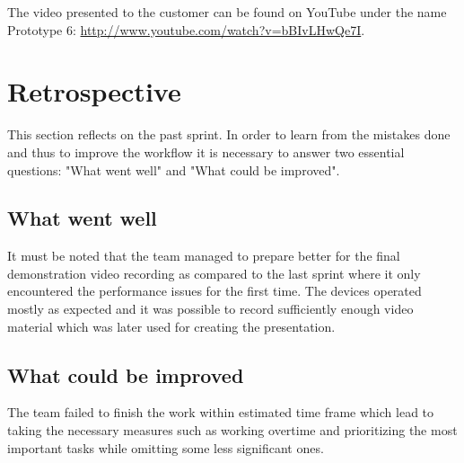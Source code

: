 The video presented to the customer can be found on YouTube under the name Prototype 6: \url{http://www.youtube.com/watch?v=bBIvLHwQe7I}.

\section{Retrospective}
This section reflects on the past sprint. In order to learn from the mistakes done and thus to improve the workflow it is necessary to answer two essential questions: "What went well" and "What could be improved".

\subsection{What went well}
It must be noted that the team managed to prepare better for the final demonstration video recording as compared to the last sprint where it only encountered the performance issues for the first time. The devices operated mostly as expected and it was possible to record sufficiently enough video material which was later used for creating the presentation.

\subsection{What could be improved}
The team failed to finish the work within estimated time frame which lead to taking the necessary measures such as working overtime and prioritizing the most important tasks while omitting some less significant ones.

